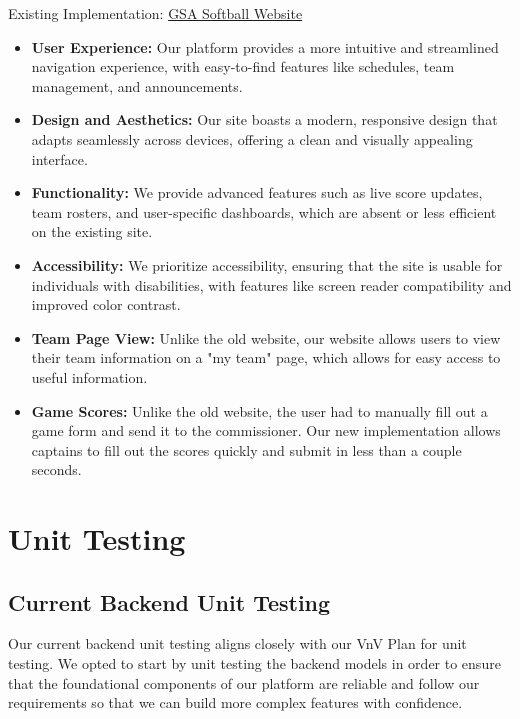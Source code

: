 \documentclass[12pt, titlepage]{article}
\begin{document}
Existing Implementation: \href{https://www.gsasoftball.ca/}{GSA Softball Website}

    \begin{itemize}
        \item \textbf{User Experience:} Our platform provides a more intuitive and streamlined navigation experience, with easy-to-find features like schedules, team management, and announcements.
        \item \textbf{Design and Aesthetics:} Our site boasts a modern, responsive design that adapts seamlessly across devices, offering a clean and visually appealing interface.
        \item \textbf{Functionality:} We provide advanced features such as live score updates, team rosters, and user-specific dashboards, which are absent or less efficient on the existing site.
        \item \textbf{Accessibility:} We prioritize accessibility, ensuring that the site is usable for individuals with disabilities, with features like screen reader compatibility and improved color contrast.
         \item \textbf{Team Page View:} Unlike the old website, our website allows users to view their team information on a "my team" page, which allows for easy access to useful information.
         \item \textbf{Game Scores:} Unlike the old website, the user had to manually fill out a game form and send it to the commissioner. Our new implementation allows captains to fill out the scores quickly and submit in less than a couple seconds.
    \end{itemize}

\section{Unit Testing}

\subsection{Current Backend Unit Testing}

Our current backend unit testing aligns closely with our VnV Plan for unit testing. We opted to start by unit testing the backend models in order to ensure that the foundational components of our platform are reliable and follow our requirements so that we can build more complex features with confidence.
\end{document}
